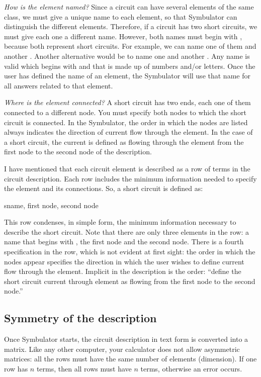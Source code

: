 \emph{How is the element named?} Since a circuit can have several
elements of the same class, we must give a unique name to each
element, so that Symbulator can distinguish the different elements.
Therefore, if a circuit has two short circuits, we must give each
one a different name. However, both names must begin with ,
because both represent short circuits. For example, we can name one
of them  and another . Another alternative would
be to name one  and another . Any name is valid
which begins with  and that is made up of numbers and/or
letters. Once the user has defined the name of an element, the
Symbulator will use that name for all answers related to that
element.

\emph{Where is the element connected?} A short circuit has two ends,
each one of them connected to a different node. You must specify
both nodes to which the short circuit is connected. In the
Symbulator, the order in which the nodes are listed always indicates
the direction of current flow through the element. In the case of a
short circuit, the current is defined as flowing through the element
from the first node to the second node of the description.

I have mentioned that each circuit element is described as a row of
terms in the circuit description. Each row includes the minimum
information needed to specify the element and its connections. So, a
short circuit is defined as:

\begin{entry}
sname, first node, second node
\end{entry}

This row condenses, in simple form, the minimum information
necessary to describe the short circuit. Note that there are only
three elements in the row: a name that begins with , the
first node and the second node. There is a fourth specification in
the row, which is not evident at first sight: the order in which the
nodes appear specifies the direction in which the user wishes to
define current flow through the element. Implicit in the description
is the order: ``define the short circuit current through element
 as flowing from the first node to the second node.''

\subsection{Symmetry of the description}

Once Symbulator starts, the circuit description in text form is
converted into a matrix. Like any other computer, your calculator
does not allow asymmetric matrices: all the rows must have the same
number of elements (dimension). If one row has $n$ terms, then all
rows must have $n$ terms, otherwise an error occurs.

